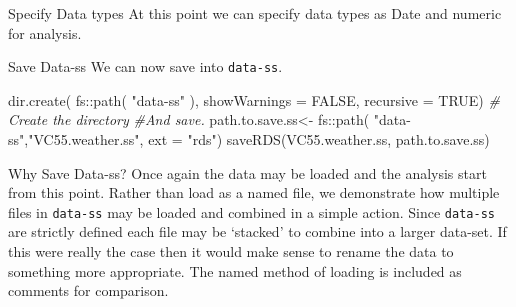 \documentclass[
  ignorenonframetext,
]{beamer}
\newenvironment{Shaded}{\begin{snugshade}}{\end{snugshade}}
\newcommand{\AttributeTok}[1]{\textcolor[rgb]{0.77,0.63,0.00}{#1}}
\newcommand{\CommentTok}[1]{\textcolor[rgb]{0.56,0.35,0.01}{\textit{#1}}}
\newcommand{\ConstantTok}[1]{\textcolor[rgb]{0.00,0.00,0.00}{#1}}
\newcommand{\FunctionTok}[1]{\textcolor[rgb]{0.00,0.00,0.00}{#1}}
\newcommand{\NormalTok}[1]{#1}
\newcommand{\OtherTok}[1]{\textcolor[rgb]{0.56,0.35,0.01}{#1}}
\newcommand{\SpecialCharTok}[1]{\textcolor[rgb]{0.00,0.00,0.00}{#1}}
\newcommand{\StringTok}[1]{\textcolor[rgb]{0.31,0.60,0.02}{#1}}
\begin{document}
\begin{frame}[fragile]{Specify Data types}
\protect\hypertarget{specify-data-types}{}
At this point we can specify data types as Date and numeric for
analysis.

\begin{Shaded}
\end{Shaded}
\end{frame}

\begin{frame}[fragile]{Save Data-ss}
\protect\hypertarget{save-data-ss}{}
We can now save into \texttt{data-ss}.

\begin{Shaded}
\begin{Highlighting}[]
\FunctionTok{dir.create}\NormalTok{( }
\NormalTok{          fs}\SpecialCharTok{::}\FunctionTok{path}\NormalTok{( }
            \StringTok{"data{-}ss"}\NormalTok{ ),  }
            \AttributeTok{showWarnings =} \ConstantTok{FALSE}\NormalTok{,}
            \AttributeTok{recursive =} \ConstantTok{TRUE}\NormalTok{) }\CommentTok{\# Create the directory}
\CommentTok{\#And save.}
\NormalTok{path.to.save.ss}\OtherTok{\textless{}{-}}\NormalTok{ fs}\SpecialCharTok{::}\FunctionTok{path}\NormalTok{( }
                               \StringTok{"data{-}ss"}\NormalTok{,}\StringTok{"VC55.weather.ss"}\NormalTok{,}
                            \AttributeTok{ext =} \StringTok{"rds"}\NormalTok{)}
\FunctionTok{saveRDS}\NormalTok{(VC55.weather.ss, path.to.save.ss)}
\end{Highlighting}
\end{Shaded}
\end{frame}

\begin{frame}[fragile]{Why Save Data-ss?}
\protect\hypertarget{why-save-data-ss}{}
Once again the data may be loaded and the analysis start from this
point. Rather than load as a named file, we demonstrate how multiple
files in \texttt{data-ss} may be loaded and combined in a simple action.
Since \texttt{data-ss} are strictly defined each file may be `stacked'
to combine into a larger data-set. If this were really the case then it
would make sense to rename the data to something more appropriate. The
named method of loading is included as comments for comparison.
\end{frame}
\end{document}
